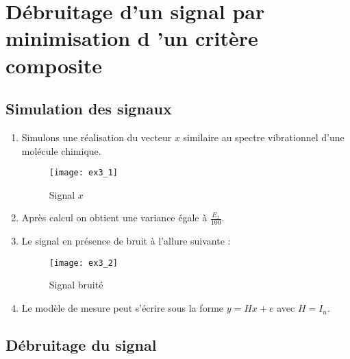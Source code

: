 \documentclass[12pt,a4paper,titlepage]{article}
\begin{document}
\newpage
\section{Débruitage d’un signal par minimisation d ’un critère composite}

\subsection{Simulation des signaux}

\begin{enumerate}

    \item{
            Simulons une réalisation du vecteur $x$ similaire au spectre vibrationnel
            d'une molécule chimique.

            \begin{figure}[H]
                \centering
                \texttt{[image: ex3\_1]}
                \caption{Signal $x$}
            \end{figure}
        }

    \item{
            Après calcul on obtient une variance égale à $\frac{E_x}{100}$.
        }

    \item{Le signal en présence de bruit à l'allure suivante :

            \begin{figure}[H]
                \centering
                \texttt{[image: ex3\_2]}
                \caption{Signal bruité}
            \end{figure}
        }

    \item{Le modèle de mesure peut s'écrire sous la forme $y = Hx + e$ avec $H = I_n$.}

\end{enumerate}

\subsection{Débruitage du signal}
\end{document}
